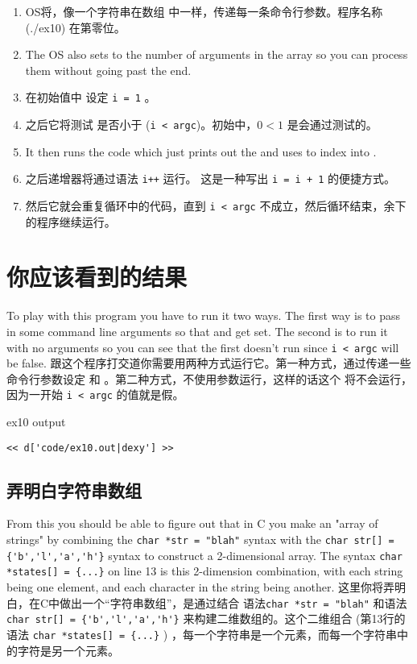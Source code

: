 \begin{enumerate}
\item OS将，像一个字符串在数组  中一样，传递每一条命令行参数。程序名称 (./ex10) 在第零位。
\item The OS also sets  to the number of arguments in the 	
	 array so you can process them without going past the end.
\item 在初始值中  设定 \verb|i = 1| 。
\item 之后它将测试  是否小于  (\verb|i < argc|)。初始中，$0 < 1$ 是会通过测试的。
\item It then runs the code which just prints out the  and 
    uses  to index into .
\item 之后递增器将通过语法 \verb|i++| 运行。 这是一种写出 \verb|i = i + 1| 的便捷方式。
\item 然后它就会重复循环中的代码，直到 \verb|i < argc| 不成立，然后循环结束，余下的程序继续运行。
\end{enumerate}


\section{你应该看到的结果}

To play with this program you have to run it two ways.  The first way is to
pass in some command line arguments so that  and 
get set.  The second is to run it with no arguments so you can see that
the first  doesn't run since \verb|i < argc| will be false.
跟这个程序打交道你需要用两种方式运行它。第一种方式，通过传递一些命令行参数设定  和  。第二种方式，不使用参数运行，这样的话这个  将不会运行，因为一开始 \verb|i < argc| 的值就是假。

\begin{code}{ex10 output}
\begin{lstlisting}
<< d['code/ex10.out|dexy'] >>
\end{lstlisting}
\end{code}

\subsection{弄明白字符串数组}

From this you should be able to figure out that in C you make an "array of
strings" by combining the \verb|char *str = "blah"| syntax with the
\verb|char str[] = {'b','l','a','h'}| syntax to construct a 2-dimensional
array.  The syntax \verb|char *states[] = {...}| on line 13 is this
2-dimension combination, with each string being one element, and each
character in the string being another.
这里你将弄明白，在C中做出一个“字符串数组”，是通过结合 语法\verb|char *str = "blah"| 和语法 \verb|char str[] = {'b','l','a','h'}| 来构建二维数组的。这个二维组合 (第13行的语法 \verb|char *states[] = {...}| ) ，每一个字符串是一个元素，而每一个字符串中的字符是另一个元素。


